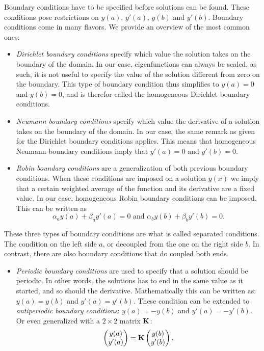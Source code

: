 Boundary conditions have to be specified before solutions can be found. These conditions pose restrictions on $y(a)$, $y'(a)$, $y(b)$ and $y'(b)$. Boundary conditions come in many flavors. We provide an overview of the most common ones:
\begin{itemize}
    \item \emph{Dirichlet boundary conditions} specify which value the solution takes on the boundary of the domain. In our case, eigenfunctions can always be scaled, as such, it is not useful to specify the value of the solution different from zero on the boundary. This type of boundary condition thus simplifies to $y(a) = 0$ and $y(b) = 0$, and is therefor called the homogeneous Dirichlet boundary conditions.
    \item \emph{Neumann boundary conditions} specify which value the derivative of a solution takes on the boundary of the domain. In our case, the same remark as given for the Dirichlet boundary conditions applies. This means that homogeneous Neumann boundary conditions imply that $y'(a) = 0$ and $y'(b) = 0$.
    \item \emph{Robin boundary conditions} are a generalization of both previous boundary conditions. When these conditions are imposed on a solution $y(x)$ we imply that a certain weighted average of the function and its derivative are a fixed value. In our case, homogeneous Robin boundary conditions can be imposed. This can be written as
          $$
              \alpha_a y(a) + \beta_a y'(a) = 0 \text{ and } \alpha_b y(b) + \beta_b y'(b) = 0  \text{.}
          $$
\end{itemize}
These three types of boundary conditions are what is called separated conditions. The condition on the left side $a$, or decoupled from the one on the right side $b$. In contrast, there are also boundary conditions that do coupled both ends.
\begin{itemize}
    \item \emph{Periodic boundary conditions} are used to specify that a solution should be periodic. In other words, the solutions has to end in the same value as it started, and so should the derivative. Mathematically this can be written as: $y(a) = y(b)$ and $y'(a) = y'(b)$. These condition can be extended to \emph{antiperiodic boundary conditions}: $y(a) = -y(b)$ and $y'(a) = -y'(b)$. Or even generalized with a $2 \times 2$ matrix $\vb{K}$:
          $$
              \begin{pmatrix} y(a) \\ y'(a) \end{pmatrix} = \vb{K} \begin{pmatrix} y(b) \\ y'(b) \end{pmatrix}\text{.}
          $$
\end{itemize}

